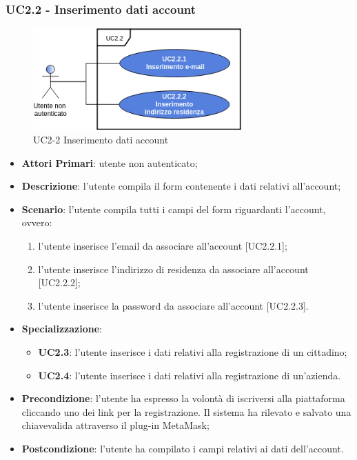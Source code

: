 \subsubsection{UC2.2 - Inserimento dati account}
\begin{figure}[h]
	\includegraphics[width=8cm]{res/images/UC2-2RegistrazioneGenerale.png}
	\centering
	\caption{UC2-2 Inserimento dati account}
\end{figure}
\begin{itemize}
	\item \textbf{Attori Primari}: utente non autenticato;
	\item \textbf{Descrizione}: l'utente compila il form contenente i dati relativi all'account;
	\item \textbf{Scenario}: l'utente compila tutti i campi del form riguardanti l'account, ovvero:
		\begin{enumerate}[label=\alph*.]
		\item l'utente inserisce l'email da associare all'account [UC2.2.1];
		\item l'utente inserisce l'indirizzo di residenza da associare all'account [UC2.2.2];
		\item l'utente inserisce la password da associare all'account [UC2.2.3].
		\end{enumerate}
	\item \textbf{Specializzazione}:
	\begin{itemize}
		\item \textbf{UC2.3}: l'utente inserisce i dati relativi alla registrazione di un cittadino;
		\item \textbf{UC2.4}: l'utente inserisce i dati relativi alla registrazione di un'azienda.
	
	\end{itemize}
	\item \textbf{Precondizione}: l'utente ha espresso la volontà di iscriversi alla piattaforma cliccando uno dei link per la registrazione. Il sistema ha rilevato e salvato una chiave\glosp valida attraverso il plug-in MetaMask\glo;
	\item \textbf{Postcondizione}: l'utente ha compilato i campi relativi ai dati dell'account.
	
\end{itemize}
